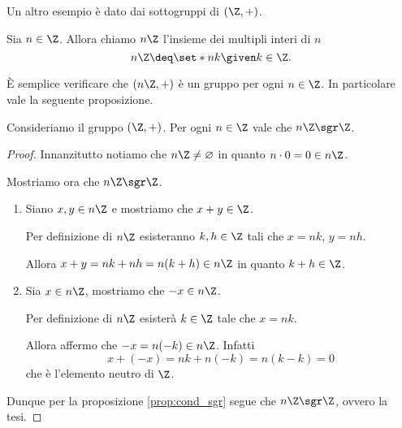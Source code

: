 Un altro esempio è dato dai sottogruppi di $(\Z, +)$.

\begin{definition}
    Sia $n \in \Z$. Allora chiamo $n\Z$ l'insieme dei multipli interi di $n$ \[
         n\Z \deq \set*{nk \given k \in \Z}.
    \]
\end{definition}

È semplice verificare che $(n\Z, +)$ è un gruppo per ogni $n \in \Z$. In particolare vale la seguente proposizione.

\begin{proposition}
    [$n\Z$ è sottogruppo di $\Z$] \label{prop:nZ_sgr_Z}
    Consideriamo il gruppo $(\Z, +)$.
    Per ogni $n \in \Z$ vale che $n\Z \sgr \Z$.
\end{proposition}
\begin{proof}
    Innanzitutto notiamo che $n\Z \neq \varnothing$ in quanto $n \cdot 0 = 0 \in n\Z$. 
    
    Mostriamo ora che $n\Z \sgr \Z$.
    \begin{enumerate}[label={(\arabic*)}]
        \item Siano $x, y \in n\Z$ e mostriamo che $x+y \in \Z$. 
        
        Per definizione di $n\Z$ esisteranno $k, h \in \Z$ tali che $x = nk$, $y = nh$.
        
        Allora $x + y = nk + nh = n(k + h) \in n\Z$ in quanto $k + h \in \Z$.
        \item Sia $x \in n\Z$, mostriamo che $-x \in n\Z$.
        
        Per definizione di $n\Z$ esisterà $k \in \Z$ tale che $x = nk$.

        Allora affermo che $-x = n(-k) \in n\Z$. Infatti \[
            x + (-x) = nk + n(-k) = n(k - k) = 0    
        \] che è l'elemento neutro di $\Z$.
    \end{enumerate}

    Dunque per la proposizione \ref{prop:cond_sgr} segue che $n\Z \sgr \Z$, ovvero la tesi.
\end{proof}


